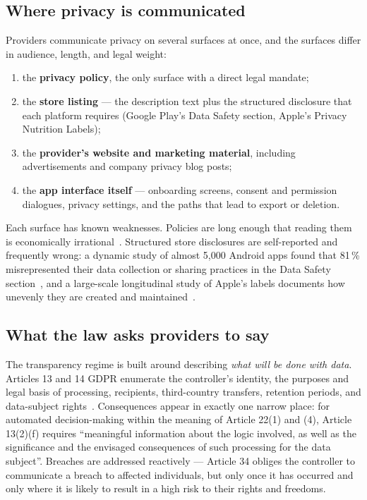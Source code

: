 \subsection{Where privacy is communicated}

Providers communicate privacy on several surfaces at once, and the surfaces
differ in audience, length, and legal weight:

\begin{enumerate}[leftmargin=*,itemsep=2pt]
  \item the \textbf{privacy policy}, the only surface with a direct legal
        mandate;
  \item the \textbf{store listing} --- the description text plus the structured
        disclosure that each platform requires (Google Play's Data Safety
        section, Apple's Privacy Nutrition Labels);
  \item the \textbf{provider's website and marketing material}, including
        advertisements and company privacy blog posts;
  \item the \textbf{app interface itself} --- onboarding screens, consent and
        permission dialogues, privacy settings, and the paths that lead to
        export or deletion.
\end{enumerate}

Each surface has known weaknesses. Policies are long enough that reading them is
economically irrational~\parencite{mcdonald2008cost}. Structured store
disclosures are self-reported and frequently wrong: a dynamic study of almost
5{,}000 Android apps found that 81\,\% misrepresented their data collection or
sharing practices in the Data Safety
section~\parencite{arkalakis2024abandon}, and a large-scale longitudinal study of
Apple's labels documents how unevenly they are created and
maintained~\parencite{li2022ios}.

\subsection{What the law asks providers to say}
\label{sec:law}

The transparency regime is built around describing \emph{what will be done with
data}. Articles 13 and 14 GDPR enumerate the controller's identity, the purposes
and legal basis of processing, recipients, third-country transfers, retention
periods, and data-subject rights~\parencite{gdpr2016}. Consequences appear in
exactly one narrow place: for automated decision-making within the meaning of
Article 22(1) and (4), Article 13(2)(f) requires \enquote{meaningful information
about the logic involved, as well as the significance and the envisaged
consequences of such processing for the data subject}. Breaches are addressed
reactively --- Article 34 obliges the controller to communicate a breach to
affected individuals, but only once it has occurred and only where it is likely
to result in a high risk to their rights and freedoms.

